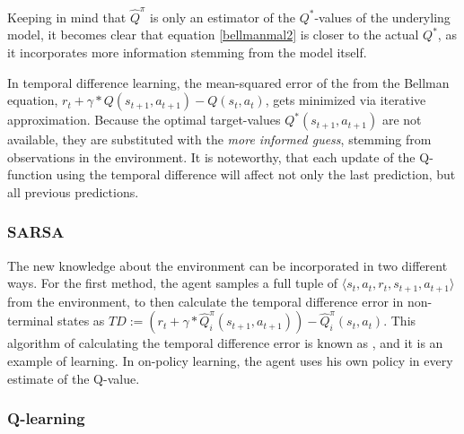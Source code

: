 Keeping in mind that $\hat{Q}^\pi$ is only an estimator of the $Q^*$-values of the underyling model, it becomes clear that equation \ref{bellmanmal2} is closer to the actual $Q^*$, as it incorporates more information stemming from the model itself. 

In temporal difference learning, the mean-squared error of the  from the Bellman equation, $r_t + \gamma * Q(s_{t+1},a_{t+1}) - Q(s_t,a_t)$, gets minimized via iterative approximation. Because the optimal target-values $Q^*(s_{t+1},a_{t+1})$ are not available, they are substituted with the \textit{more informed guess}, stemming from observations in the environment. It is noteworthy, that each update of the Q-function using the temporal difference will affect not only the last prediction, but all previous predictions.



\subsubsection{\textsc{SARSA}}
The new knowledge about the environment can be incorporated in two different ways. For the first method, the agent samples a full tuple of $\langle s_t, a_t, r_t, s_{t+1}, a_{t+1} \rangle$ from the environment, to then calculate the temporal difference error in non-terminal states as $ TD := (r_t + \gamma * \hat{Q}_i^\pi(s_{t+1}, a_{t+1})) - \hat{Q}_i^\pi(s_t, a_t)  $. This algorithm of calculating the temporal difference error is known as  , and it is an example of  learning. In on-policy learning, the agent uses his own policy in every estimate of the Q-value. 

\subsubsection{Q-learning}


